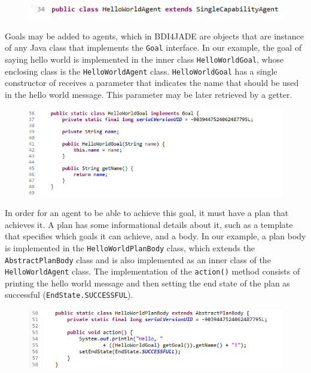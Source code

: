 \documentclass{article}
\begin{document}
\begin{figure}[!h]
\centering
\includegraphics[width=\linewidth]{agentdecl}
\label{fig:agentdecl}
\end{figure}

Goals may be added to agents, which in BDI4JADE are objects that are instance of any Java class that implements the \texttt{Goal} interface. In our example, the goal of saying hello world is implemented in the inner class \texttt{HelloWorldGoal}, whose enclosing class is the \texttt{HelloWorldAgent} class. \texttt{HelloWorldGoal} has a single constructor of receives a parameter that indicates the name that should be used in the hello world message. This parameter may be later retrieved by a getter.

\begin{figure}[!h]
\centering
\includegraphics[width=\linewidth]{AgentGoal}
\label{fig:agentGoal}
\end{figure}

In order for an agent to be able to achieve this goal, it must have a plan that achieves it. A plan has some informational details about it, such as a template that specifies which goals it can achieve, and a body.  In our example, a plan body is implemented in the \texttt{HelloWorldPlanBody} class, which extends the \texttt{AbstractPlanBody} class and is also implemented as an inner class of the \texttt{HelloWorldAgent} class. The implementation of the \texttt{action()} method consists of printing the hello world message and then setting the end state of the plan as successful (\texttt{EndState.SUCCESSFUL}).

\begin{figure}[!h]
\centering
\includegraphics[width=\linewidth]{helloplan}
\label{fig:helloplan}
\end{figure}
\end{document}
